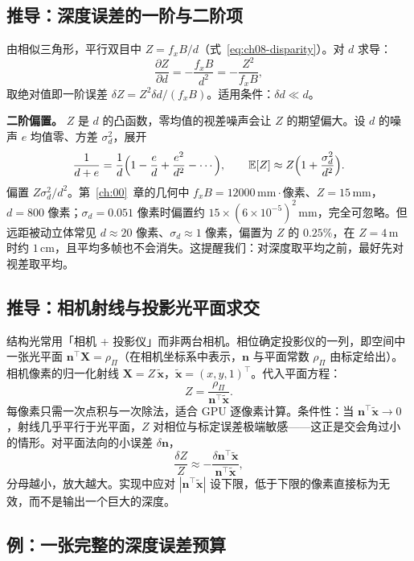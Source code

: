 \subsection{推导：深度误差的一阶与二阶项}

由相似三角形，平行双目中 $Z=f_xB/d$（式~\eqref{eq:ch08-disparity}）。对 $d$ 求导：
\[
  \frac{\partial Z}{\partial d}=-\frac{f_xB}{d^2}=-\frac{Z^2}{f_xB},
\]
取绝对值即一阶误差 $\delta Z=Z^2\delta d/(f_xB)$。适用条件：$\delta d\ll d$。

\textbf{二阶偏置。} $Z$ 是 $d$ 的凸函数，零均值的视差噪声会让 $Z$ 的期望偏大。设 $d$ 的噪声 $e$ 均值零、方差 $\sigma_d^2$，展开
\[
  \frac{1}{d+e}=\frac1d\Bigl(1-\frac ed+\frac{e^2}{d^2}-\cdots\Bigr),\qquad
  \mathbb E[Z]\approx Z\Bigl(1+\frac{\sigma_d^2}{d^2}\Bigr).
\]
偏置 $Z\sigma_d^2/d^2$。第~\ref{ch:00}~章的几何中 $f_xB=12000\,\mathrm{mm}\cdot$像素、$Z=15\,\mathrm{mm}$，$d=800$ 像素；$\sigma_d=0.051$ 像素时偏置约 $15\times(6\times10^{-5})^2\,\mathrm{mm}$，完全可忽略。但远距被动立体常见 $d\approx20$ 像素、$\sigma_d\approx1$ 像素，偏置为 $Z$ 的 $0.25\%$，在 $Z=4\,\mathrm{m}$ 时约 $1\,\mathrm{cm}$，且平均多帧也不会消失。这提醒我们：对深度取平均之前，最好先对视差取平均。

\subsection{推导：相机射线与投影光平面求交}

结构光常用「相机 + 投影仪」而非两台相机。相位确定投影仪的一列，即空间中一张光平面 $\boldsymbol n^\top\boldsymbol X=\rho_\Pi$（在相机坐标系中表示，$\boldsymbol n$ 与平面常数 $\rho_\Pi$ 由标定给出）。相机像素的归一化射线 $\boldsymbol X=Z\,\tilde{\boldsymbol x}$，$\tilde{\boldsymbol x}=(x,y,1)^\top$。代入平面方程：
\[
  Z=\frac{\rho_\Pi}{\boldsymbol n^\top\tilde{\boldsymbol x}} .
\]
每像素只需一次点积与一次除法，适合 GPU 逐像素计算。条件性：当 $\boldsymbol n^\top\tilde{\boldsymbol x}\to0$，射线几乎平行于光平面，$Z$ 对相位与标定误差极端敏感——这正是交会角过小的情形。对平面法向的小误差 $\delta\boldsymbol n$，
\[
  \frac{\delta Z}{Z}\approx-\frac{\delta\boldsymbol n^\top\tilde{\boldsymbol x}}{\boldsymbol n^\top\tilde{\boldsymbol x}},
\]
分母越小，放大越大。实现中应对 $|\boldsymbol n^\top\tilde{\boldsymbol x}|$ 设下限，低于下限的像素直接标为无效，而不是输出一个巨大的深度。

\subsection{例：一张完整的深度误差预算}

